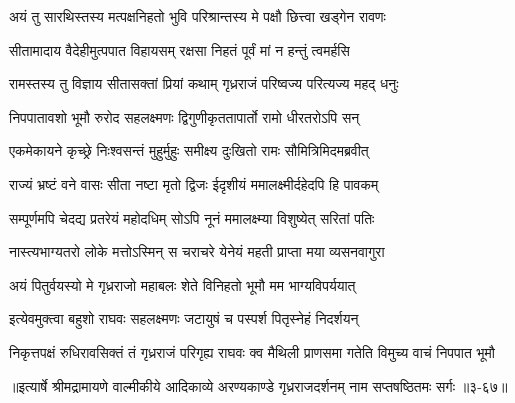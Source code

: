 \twolineshloka
{अयं तु सारथिस्तस्य मत्पक्षनिहतो भुवि}
{परिश्रान्तस्य मे पक्षौ छित्त्वा खड्गेन रावणः} %

\twolineshloka
{सीतामादाय वैदेहीमुत्पपात विहायसम्}
{रक्षसा निहतं पूर्वं मां न हन्तुं त्वमर्हसि} %

\twolineshloka
{रामस्तस्य तु विज्ञाय सीतासक्तां प्रियां कथाम्}
{गृध्रराजं परिष्वज्य परित्यज्य महद् धनुः} %

\twolineshloka
{निपपातावशो भूमौ रुरोद सहलक्ष्मणः}
{द्विगुणीकृततापार्तो रामो धीरतरोऽपि सन्} %

\twolineshloka
{एकमेकायने कृच्छ्रे निःश्वसन्तं मुहुर्मुहुः}
{समीक्ष्य दुःखितो रामः सौमित्रिमिदमब्रवीत्} %

\twolineshloka
{राज्यं भ्रष्टं वने वासः सीता नष्टा मृतो द्विजः}
{ईदृशीयं ममालक्ष्मीर्दहेदपि हि पावकम्} %

\twolineshloka
{सम्पूर्णमपि चेदद्य प्रतरेयं महोदधिम्}
{सोऽपि नूनं ममालक्ष्म्या विशुष्येत् सरितां पतिः} %

\twolineshloka
{नास्त्यभाग्यतरो लोके मत्तोऽस्मिन् स चराचरे}
{येनेयं महती प्राप्ता मया व्यसनवागुरा} %

\twolineshloka
{अयं पितुर्वयस्यो मे गृध्रराजो महाबलः}
{शेते विनिहतो भूमौ मम भाग्यविपर्ययात्} %

\twolineshloka
{इत्येवमुक्त्वा बहुशो राघवः सहलक्ष्मणः}
{जटायुषं च पस्पर्श पितृस्नेहं निदर्शयन्} %

\twolineshloka
{निकृत्तपक्षं रुधिरावसिक्तं तं गृध्रराजं परिगृह्य राघवः}
{क्व मैथिली प्राणसमा गतेति विमुच्य वाचं निपपात भूमौ} %


॥इत्यार्षे श्रीमद्रामायणे वाल्मीकीये आदिकाव्ये अरण्यकाण्डे गृध्रराजदर्शनम् नाम सप्तषष्ठितमः सर्गः ॥३-६७॥
